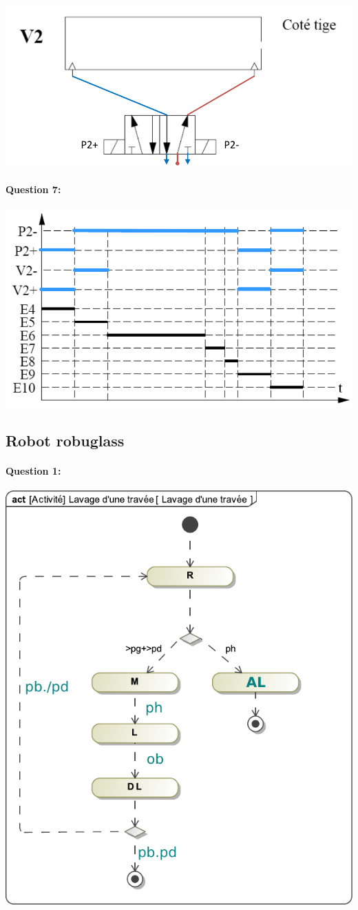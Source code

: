 \begin{center}
 \includegraphics[width=0.7\linewidth]{img/distrib_cor}
\end{center}

\paragraph{Question 7:}

\begin{center}
 \includegraphics[width=0.7\linewidth]{img/chronogramme_cor}
\end{center}

\subsection{Robot robuglass}

\paragraph{Question 1:}

\begin{center}
 \includegraphics[width=0.7\linewidth]{img/Lavage_travee_cor}
\end{center}

